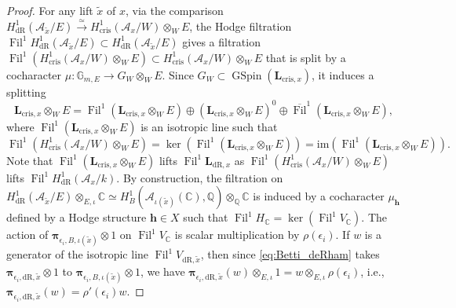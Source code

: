 \documentclass{amsart}
\numberwithin{equation}{subsection}
\numberwithin{theorem}{section}
\theoremstyle{definition}
\theoremstyle{remark}
\newcommand{\bC}{\mathbb{C}}
\newcommand{\bG}{\mathbb{G}}
\newcommand{\bQ}{\mathbb{Q}}
\newcommand{\dR}{_{\mathrm{dR}}}
\newcommand{\cris}{_{\mathrm{cris}}}
\newcommand*{\im}{\text{im}}
\DeclareMathOperator{\GSpin}{GSpin}
\DeclareMathOperator{\Fil}{Fil}
\begin{document}
\begin{proof}
    For any lift $\tilde{x}$ of $x$, via  the comparison $H^1\dR(\mathcal{A}_{\tilde{x}}/E)\xrightarrow{\simeq}H^1\cris(\mathcal{A}_x/W)\otimes_W E$, the Hodge filtration $\Fil^1H^1\dR(\mathcal{A}_{\tilde{x}}/E)\subset H^1\dR(\mathcal{A}_{\tilde{x}}/E)$ gives a filtration $\Fil^1(H^1\cris(\mathcal{A}_{x}/W)\otimes_W E )
    \subset H^1\cris(\mathcal{A}_{x}/W)\otimes_W E$ that is split by a cocharacter $\mu: \bG_{m, E}\to G_W\otimes_W E$. Since $G_W\subset \GSpin(\bm{L}_{\mathrm{cris}, x})$, it induces a splitting \[\bm{L}_{\mathrm{cris},x} \otimes_{W}E = \Fil^1 (\bm{L}_{\mathrm{cris}, x}\otimes_W E) \oplus (\bm{L}_{\mathrm{cris}, x}\otimes_W E)^0\oplus \overline{\Fil}^1(\bm{L}_{\mathrm{cris}, x}\otimes_W E),\] where $\Fil^1 (\bm{L}_{\mathrm{cris}, x}\otimes_W E)$ is an isotropic line such that \begin{equation}\label{eq:filtration}
        \Fil^1(H^1\cris(\mathcal{A}_{x}/W)\otimes_W E) = \ker (\Fil^1(\bm{L}_{\mathrm{cris}, x}\otimes_W E)) = \im(\Fil^1(\bm{L}_{\mathrm{cris}, x}\otimes_W E)).
    \end{equation}
    Note that $\Fil^1 (\bm{L}_{\mathrm{cris}, x}\otimes_W E)$ lifts $\Fil^1 \bm{L}_{\mathrm{dR}, x}$ as $\Fil^1(H^1\cris(\mathcal{A}_{x}/W)\otimes_W E)$ lifts $\Fil^1H^1\dR(\mathcal{A}_{x}/k)$. 
    By construction, the filtration on $H^1\dR(\mathcal{A}_{\tilde{x}}/E) \otimes_{E, \iota} \bC \simeq  H^1_B(\mathcal{A}_{\iota(\tilde{x})}(\bC), \bQ)\otimes_{\bQ} \bC$ is induced by a cocharacter $\mu_{\mathbf{h}}$ defined by a Hodge structure $\mathbf{h}\in X$ such that $\Fil^1 H_{\bC} = \ker (\Fil^1 V_{\bC})$. The action of $\bm{\pi}_{{\epsilon_i}, B, \iota(\tilde{x})} \otimes 1$ on $\Fil^1 V_{\bC}$ is scalar multiplication by $\rho(\epsilon_i)$.  If $w$ is a generator of the isotropic line $\Fil^1 V_{\mathrm{dR},\tilde{x}}$, then since \eqref{eq:Betti_deRham} takes $\bm{\pi}_{{\epsilon_i}, \mathrm{dR}, \tilde{x}} \otimes 1$ to $\bm{\pi}_{{\epsilon_i}, B, \iota(\tilde{x})} \otimes 1$, we have $\bm{\pi}_{{\epsilon_i}, \mathrm{dR}, \tilde{x}} (w) \otimes_{E, \iota} 1= w\otimes_{E, \iota}\rho({\epsilon_i})$, i.e., $\bm{\pi}_{{\epsilon_i}, \mathrm{dR}, \tilde{x}} (w) = \rho'({\epsilon_i}) w$. 
    

\end{proof}
\end{document}
